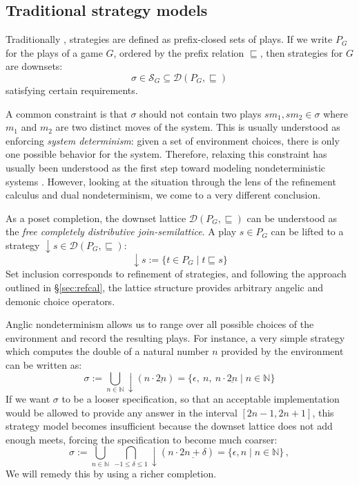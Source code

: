 \documentclass[format=sigplan,authordraft]{acmart}
\begin{document}
\subsection{Traditional strategy models} \label{sec:strat} %

Traditionally \cite{gamesem99},
strategies are defined as
prefix-closed sets of plays.
If we write $P_G$ for the plays of a game $G$,
ordered by the prefix relation $\sqsubseteq$,
then strategies for $G$ are downsets:
\[
    \sigma \in
      \mathcal{S}_G \subseteq
      \mathcal{D}(P_G, {\sqsubseteq})
\]
satisfying certain requirements.

A common constraint is that $\sigma$
should not contain two plays $s m_1, s m_2 \in \sigma$
where $m_1$ and $m_2$ are two distinct moves of the system.
This is usually understood as
enforcing \emph{system determinism}:
given a set of environment choices,
there is only one possible behavior for the system.
Therefore,
relaxing this constraint has usually been understood
as the first step toward modeling nondeterministic systems
\cite{gsfnd}.
However,
looking at the situation through the lens of
the refinement calculus and dual nondeterminism,
we come to a very different conclusion.

As a poset completion,
the downset lattice
$\mathcal{D}(P_G, {\sqsubseteq})$
can be understood as
the \emph{free completely distributive join-semilattice}.
A play $s \in P_G$ can be lifted to a strategy
${\downarrow} s \in \mathcal{D}(P_G, {\sqsubseteq})$:
\[
    {\downarrow} s := \{ t \in P_G \mid t \sqsubseteq s \}
\]
Set inclusion corresponds to refinement of strategies,
and following the approach outlined in \S\ref{sec:refcal},
the lattice structure provides
arbitrary angelic and demonic choice operators.

Anglic nondeterminism
allows us to range over all possible choices of the environment
and record the resulting plays.
For instance,
a very simple strategy which computes
the double of a natural number $n$
provided by the environment
can be written as:
\[
  \sigma :=
    \bigcup_{n \in \mathbb{N}} {\downarrow}(n \cdot \underline{2n}) =
    \{ \epsilon, \: n, \: n \cdot \underline{2n} \mid n \in \mathbb{N} \}
\]
If we want $\sigma$ to be a looser specification,
so that an acceptable implementation
would be allowed to provide any answer in the interval
$[2n - 1, 2n + 1]$,
this strategy model becomes insufficient
because the downset lattice does not add enough meets,
forcing the specification to become
much coarser:
\[
  \sigma :=
    \bigcup_{n \in \mathbb{N}} \:
    \bigcap_{-1 \le \delta \le 1}
    {\downarrow}(n \cdot \underline{2n+\delta}) =
    \{ \epsilon, n \mid n \in \mathbb{N} \} \,,
\]
We will remedy this by using a richer completion.
\end{document}
